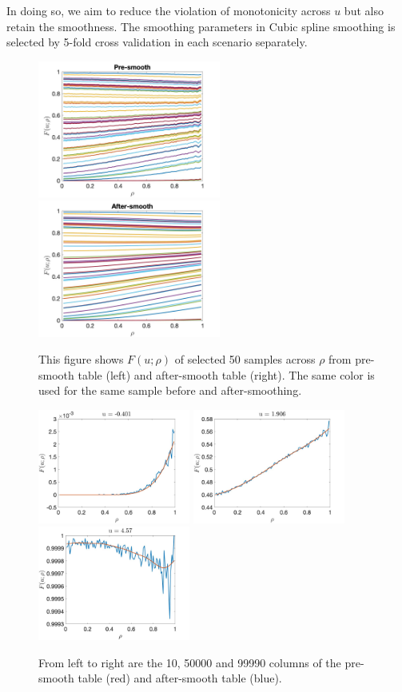 \documentclass{article}
\begin{document}
In doing so, we aim to reduce the violation of monotonicity across $u$ but also retain the smoothness. The smoothing parameters in Cubic spline smoothing is selected by 5-fold cross validation in each scenario separately.

\begin{figure}[!htp]
\centering
\includegraphics[width=6cm]{figure/presmooth_3D.jpg}
\includegraphics[width=6cm]{figure/Aftersmooth_3D.jpg}
\caption{This figure shows $F(u;\rho)$ of selected 50 samples across $\rho$ from pre-smooth table (left) and after-smooth table (right). The same color is used for the same sample before and after-smoothing.\label{fig4}}
\end{figure}

\begin{figure}[!htp]
\centering
\includegraphics[width=5cm]{figure/3D_cubic_10.jpg}
\includegraphics[width=5cm]{figure/3D_cubic_50000.jpg}
\includegraphics[width=5cm]{figure/3D_cubic_99990.jpg}
\caption{From left to right are the 10, 50000 and 99990 columns of the pre-smooth table (red) and after-smooth table (blue). \label{fig5}}
\end{figure}
\end{document}

